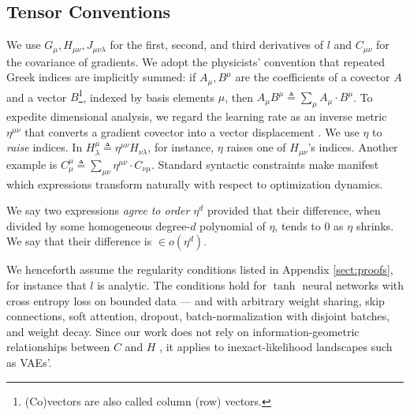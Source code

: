 \documentclass{article}
\begin{document}
    \subsection{Tensor Conventions}
        We use $G_\mu, H_{\mu\nu}, J_{\mu\nu\lambda}$ for the first, second,
        and third derivatives of $l$ and $C_{\mu \nu}$ for the covariance of
        gradients.  We adopt the physicists' convention that repeated Greek
        indices are implicitly summed: if $A_\mu, B^\mu$ are the coefficients
        of a covector $A$ and a vector
        $B$\footnote{
            (Co)vectors are also called column (row) vectors.
        }, indexed by basis elements $\mu$, then
        $
            A_\mu B^\mu
            \triangleq
            \sum_\mu A_\mu \cdot B^\mu
        $.
        To expedite dimensional analysis, we regard the learning rate as an
        inverse metric $\eta^{\mu\nu}$ that converts a gradient covector into a
        vector displacement \citep{bo13}.  We use $\eta$ to \emph{raise}
        indices.  In
        $
            H^{\mu}_{\lambda}
            \triangleq
            \eta^{\mu\nu} H_{\nu\lambda}
        $, for instance,
        $\eta$ raises one of $H_{\mu\nu}$'s indices.  Another example is
        $
            C^{\mu}_{\mu}
            \triangleq
            \sum_{\mu \nu} \eta^{\mu\nu} \cdot C_{\nu\mu}
        $.
        Standard syntactic constraints make manifest which expressions
        transform naturally with respect to optimization dynamics.  

        We say two expressions \emph{agree to order $\eta^d$} provided that
        their difference, when divided by some homogeneous degree-$d$
        polynomial of $\eta$, tends to $0$ as $\eta$ shrinks.  We say that
        their difference is $\in o(\eta^d)$.

        We henceforth assume the regularity conditions listed in Appendix
        \ref{sect:proofs}, for instance that $l$ is analytic.  The conditions
        hold for $\tanh$ neural networks with cross entropy loss on bounded
        data --- and with arbitrary weight sharing, skip connections, soft
        attention, dropout, batch-normalization with disjoint batches, and
        weight decay.  Since our work does not rely on information-geometric
        relationships between $C$ and $H$ \citep{am98}, it applies to
        inexact-likelihood landscapes such as VAEs'.

\end{document}
